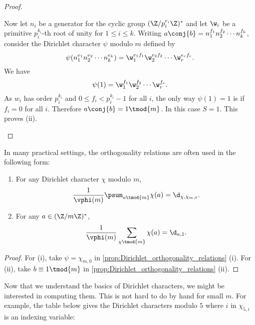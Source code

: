 \begin{proof}
\begin{enumerate}[label=(\roman*)]
\[          \]
          Now let $n_{i}$ be a generator for the cyclic group $(\Z/p_{i}^{r_{i}}\Z)^{\ast}$ and let $\w_{i}$ be a primitive $p_{i}^{k_{i}}$-th root of unity for $1 \le i \le k$. Writing $a\conj{b} = n_{1}^{f_{1}}n_{2}^{f_{2}} \cdots n_{k}^{f_{k}}$, consider the Dirichlet character $\psi$ modulo $m$ defined by
          \[
            \psi(n_{1}^{e_{1}}n_{2}^{e_{2}} \cdots n_{k}^{e_{k}}) = \w_{1}^{e_{1}f_{1}}\w_{2}^{e_{2}f_{2}} \cdots \w_{r}^{e_{r}f_{r}}.
          \]
          We have
          \[
            \psi(1) = \w_{1}^{f_{1}}\w_{2}^{f_{2}} \cdots \w_{r}^{f_{r}}.
          \]
          As $w_{i}$ has order $p_{i}^{k_{i}}$ and $0 \le f_{i} < p_{i}^{k_{i}}-1$ for all $i$, the only way $\psi(1) = 1$ is if $f_{i} = 0$ for all $i$. Therefore $a\conj{b} = 1 \tmod{m}$. In this case $S = 1$. This proves (ii).
        \end{enumerate}
      \end{proof}

      In many practical settings, the orthogonality relations are often used in the following form:

      \begin{corollary}\label{cor:Dirichlet_orthogonality_relations}
      \phantom{ }
        \begin{enumerate}[label=(\roman*)]
          \item For any Dirichlet character $\chi$ modulo $m$,
          \[
            \frac{1}{\vphi(m)}\psum_{a \tmod{m}}\chi(a) = \d_{\chi,\chi_{m,0}}.
          \]
          \item For any $a \in (\Z/m\Z)^{\ast}$,
          \[
            \frac{1}{\vphi(m)}\sum_{\chi \tmod{m}}\chi(a) = \d_{a,1}.
          \]
        \end{enumerate}
      \end{corollary}
      \begin{proof}
        For (i), take $\psi = \chi_{m,0}$ in \cref{prop:Dirichlet_orthogonality_relations} (i). For (ii), take $b \equiv 1 \tmod{m}$ in \cref{prop:Dirichlet_orthogonality_relations} (ii).
      \end{proof}

      Now that we understand the basics of Dirichlet characters, we might be interested in computing them. This is not hard to do by hand for small $m$. For example, the table below gives the Dirichlet characters modulo $5$ where $i$ in $\chi_{5,i}$ is an indexing variable:

